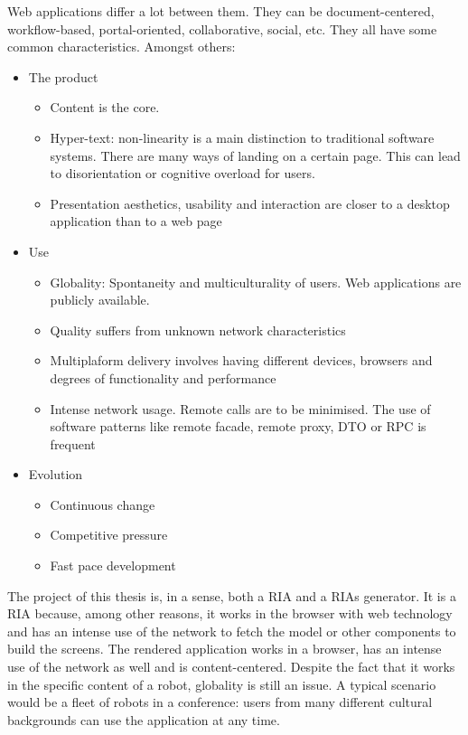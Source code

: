 Web applications differ a lot between them. 
They can be document-centered, workflow-based, portal-oriented, collaborative, social, etc. 
They all have some common characteristics. Amongst others:
\begin{itemize}
    \item The product
    \begin{itemize}
        \item Content is the core.
        \item Hyper-text: non-linearity is a main distinction to traditional software systems. There are many ways of landing on a certain page. This can lead to disorientation or cognitive overload for users.
        \item Presentation aesthetics, usability and interaction are closer to a desktop application than to a web page
    \end{itemize}
    \item Use
    \begin{itemize}
        \item Globality: Spontaneity and multiculturality of users. Web applications are publicly available.
        \item Quality suffers from unknown network characteristics
        \item Multiplaform delivery involves having different devices, browsers and degrees of functionality and performance
        \item Intense network usage. Remote calls are to be minimised. The use of software patterns like remote facade, remote proxy, DTO or RPC is frequent
    \end{itemize}
    \item Evolution
    \begin{itemize}
         \item Continuous change
         \item Competitive pressure
         \item Fast pace development
    \end{itemize}   
\end{itemize}

The project of this thesis is, in a sense, both a \ac{RIA} and a \acp{RIA} generator. 
It is a \ac{RIA} because, among other reasons, it works in the browser with web technology and has an intense use of the network to fetch the model or other components to build the screens.
The rendered application works in a browser, has an intense use of the network as well and is content-centered.
Despite the fact that it works in the specific content of a robot, globality is still an issue. A typical scenario would be a fleet of robots in a conference: users from many different cultural backgrounds can use the application at any time.


